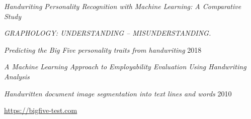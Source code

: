\documentclass[10pt, a4paper]{article}
\begin{document}
\begin{thebibliography}{99}
         \emph{Handwriting Personality Recognition with Machine  Learning: A Comparative Study}

         \emph{GRAPHOLOGY: UNDERSTANDING – MISUNDERSTANDING.}

         \emph{Predicting the Big Five personality traits from handwriting } 2018

         \emph{A Machine Learning Approach to Employability Evaluation Using Handwriting Analysis}

         \emph{Handwritten document image segmentation into text lines and words} 2010
        
         \url{https://bigfive-test.com}
    \end{thebibliography}
\end{document}
